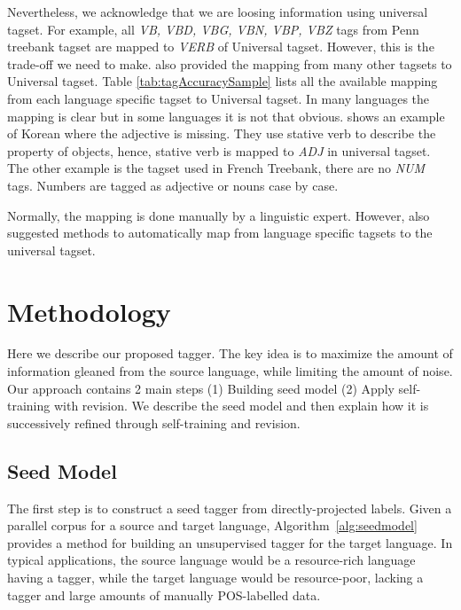 Nevertheless, we acknowledge that we are loosing information using universal tagset. For example, all \textit{VB, VBD, VBG, VBN, VBP, VBZ} tags from Penn treebank tagset are mapped to \textit{VERB} of Universal tagset. However, this is the trade-off we need to make. %
 also provided the mapping from many other tagsets to Universal tagset. Table \ref{tab:tagAccuracySample} lists all the available mapping from each language specific tagset to Universal tagset. In many languages the mapping is clear but in some languages it is not that obvious.  shows an example of Korean where the adjective is missing. They use stative verb to describe the property of objects, hence, stative verb is mapped to \textit{ADJ} in universal tagset. The other example is the tagset used in French Treebank, there are no \textit{NUM} tags. Numbers are tagged as  adjective or nouns case by case. 

Normally, the mapping is done manually by a linguistic expert. However,  also suggested methods to automatically map from language specific tagsets to the universal tagset. 

\section{Methodology}

Here we describe our proposed tagger. The key idea is to maximize the
amount of information gleaned from the source language, while limiting
the amount of noise. Our approach contains 2 main steps (1) Building seed model (2) Apply self-training with revision. We describe the seed model and then explain how it is successively refined through self-training and revision.


\subsection{Seed Model}
\label{seedModel}

The first step is to construct a seed tagger from directly-projected
labels. Given a parallel corpus for a source and target language,
Algorithm~\ref{alg:seedmodel} provides a method for building an
unsupervised tagger for the target language. In typical applications,
the source language would be a resource-rich language having a
tagger, while the target language would be resource-poor, lacking a
tagger and large amounts of manually POS-labelled data.


